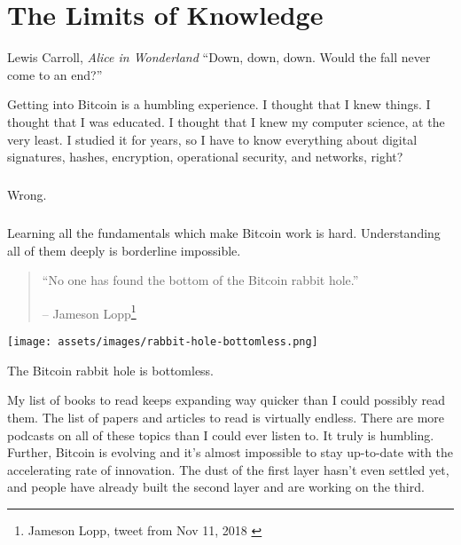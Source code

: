 \chapter{The Limits of Knowledge}
\label{les:7}

\begin{chapquote}{Lewis Carroll, \textit{Alice in Wonderland}}
\enquote{Down, down, down. Would the fall never come to an end?}
\end{chapquote}

Getting into Bitcoin is a humbling experience. I thought that I knew
things. I thought that I was educated. I thought that I knew my computer
science, at the very least. I studied it for years, so I have to know
everything about digital signatures, hashes, encryption, operational
security, and networks, right?

\paragraph{}
Wrong.

\paragraph{}
Learning all the fundamentals which make Bitcoin work is hard.
Understanding all of them deeply is borderline impossible.

\begin{quotation}\begin{samepage}
\enquote{No one has found the bottom of the Bitcoin rabbit hole.}
\begin{flushright} -- Jameson Lopp\footnote{Jameson Lopp, tweet from Nov 11, 2018 \cite{lopp-tweet}}
\end{flushright}\end{samepage}\end{quotation}

\begin{center}
  \centering
  \texttt{[image: assets/images/rabbit-hole-bottomless.png]}
  \caption{The Bitcoin rabbit hole is bottomless.}
  \label{fig:rabbit-hole-bottomless}
\end{center}

My list of books to read keeps expanding way quicker than I could
possibly read them. The list of papers and articles to read is virtually
endless. There are more podcasts on all of these topics than I could
ever listen to. It truly is humbling. Further, Bitcoin is evolving and
it's almost impossible to stay up-to-date with the accelerating rate of
innovation. The dust of the first layer hasn't even settled yet, and
people have already built the second layer and are working on the third.

